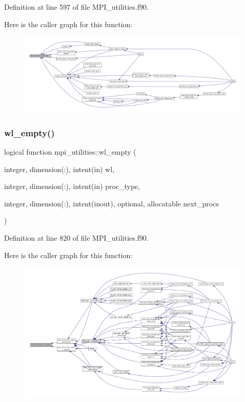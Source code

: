 Definition at line 597 of file M\+P\+I\+\_\+utilities.\+f90.

Here is the caller graph for this function\+:
\nopagebreak
\begin{figure}[H]
\begin{center}
\leavevmode
\includegraphics[width=350pt]{namespacempi__utilities_a790ea24d32dd0e249541c1e57cd85536_icgraph}
\end{center}
\end{figure}
\mbox{\label{namespacempi__utilities_a74e2e82b561f403ca8087c3925f76e29}} 
\subsubsection{\texorpdfstring{wl\+\_\+empty()}{wl\_empty()}}
{\footnotesize\ttfamily logical function mpi\+\_\+utilities\+::wl\+\_\+empty (\begin{DoxyParamCaption}\item[{integer, dimension(\+:), intent(in)}]{wl,  }\item[{integer, dimension(\+:), intent(in)}]{proc\+\_\+type,  }\item[{integer, dimension(\+:), intent(inout), optional, allocatable}]{next\+\_\+procs }\end{DoxyParamCaption})}



Definition at line 820 of file M\+P\+I\+\_\+utilities.\+f90.

Here is the caller graph for this function\+:
\nopagebreak
\begin{figure}[H]
\begin{center}
\leavevmode
\includegraphics[width=350pt]{namespacempi__utilities_a74e2e82b561f403ca8087c3925f76e29_icgraph}
\end{center}
\end{figure}


